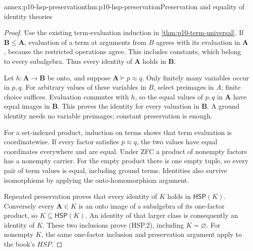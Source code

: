 
\begin{annexitem}{annex:p10-hsp-preservation}{thm:p10-hsp-preservation}{Preservation and equality of identity theories}
\begin{proof}
Use the existing term-evaluation induction in
\cref{thm:p10-term-universal}.
If \(\mathbf B\leq\mathbf A\), evaluation of a term
at arguments from \(B\) agrees with its evaluation in
\(\mathbf A\), because the restricted operations agree.
This includes constants, which belong to every subalgebra.
Thus every identity of \(\mathbf A\) holds in \(\mathbf B\).

Let \(h:\mathbf A\to\mathbf B\) be onto, and suppose
\(\mathbf A\models p\approx q\).
Only finitely many variables occur in \(p,q\).
For arbitrary values of these variables in \(B\), select
preimages in \(A\); finite choice suffices.
Evaluation commutes with \(h\), so the equal values of
\(p,q\) in \(\mathbf A\) have equal images in
\(\mathbf B\). This proves the identity for every
valuation in \(\mathbf B\). A ground identity needs
no variable preimages; constant preservation is enough.

For a set-indexed product, induction on terms shows
that term evaluation is coordinatewise. If every factor
satisfies \(p\approx q\), the two values have equal
coordinates everywhere and are equal.
Under ZFC a product of nonempty factors has a nonempty
carrier. For the empty product there is one empty tuple,
so every pair of term values is equal, including ground
terms. Identities also survive isomorphisms by applying
the onto-homomorphism argument.

Repeated preservation proves that every identity of \(K\)
holds in \(\mathsf H\mathsf S\mathsf P(K)\).
Conversely every \(\mathbf A\in K\) is an onto
image of a subalgebra of its one-factor product, so
\(K\subseteq\mathsf H\mathsf S\mathsf P(K)\).
An identity of that larger class is consequently an
identity of \(K\). These two inclusions prove (HSP.2),
including \(K=\varnothing\).
For nonempty \(K\), the same one-factor inclusion and
preservation argument apply to the book's \(HSP\).
\end{proof}
\end{annexitem}

